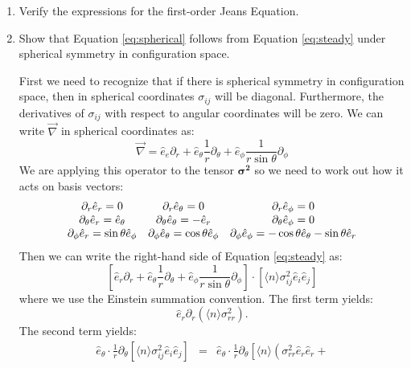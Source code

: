 \begin{enumerate}
\item Verify the expressions for the first-order Jeans Equation. 
\item Show that Equation \ref{eq:spherical} follows from
Equation \ref{eq:steady} under spherical symmetry in configuration
space. 
\begin{answer}
First we need to recognize that if there is spherical symmetry in
configuration space, then in spherical coordinates $\sigma_{ij}$ will
be diagonal. Furthermore, the derivatives of $\sigma_{ij}$ with
respect to angular coordinates will be zero. We can write
$\vec{\nabla}$ in spherical coordinates as:
\begin{equation}
\vec{\nabla} = {\hat e}_e \partial_r + {\hat
e}_\theta \frac{1}{r} \partial_\theta + {\hat
e}_\phi \frac{1}{r\sin\theta} \partial_\phi
\end{equation}
We are applying this operator to the tensor $\mathbf{\sigma^2}$ so we
need to work out how it acts on basis vectors:
\begin{equation}
\begin{array}{ccc}
\partial_r {\hat e}_r = 0 & 
\partial_r {\hat e}_\theta = 0 &
\partial_r {\hat e}_\phi = 0 \cr
\partial_\theta {\hat e}_r = {\hat e}_\theta & 
\partial_\theta {\hat e}_\theta = - {\hat e}_r &
\partial_\theta {\hat e}_\phi = 0 \cr
\partial_\phi {\hat e}_r = \sin\theta {\hat e}_\phi & 
\partial_\phi {\hat e}_\theta = \cos\theta {\hat e}_\phi &
\partial_\phi {\hat e}_\phi = - \cos\theta {\hat e}_\theta - \sin\theta {\hat e}_r \cr
\end{array}
\end{equation}
Then we can write the right-hand side of Equation \ref{eq:steady} as:
\begin{equation}
\left[{\hat e}_r \partial_r +
{\hat e}_\theta \frac{1}{r} \partial_\theta + 
{\hat e}_\phi \frac{1}{r\sin\theta} \partial_\phi\right] \cdot
\left[ \langle n\rangle \sigma_{ij}^2 {\hat e}_i {\hat e}_j \right]
\end{equation}
where we use the Einstein summation convention. The first term yields:
\begin{equation}
{\hat e}_r \partial_r \left(\langle n\rangle \sigma_{rr}^2\right).
\end{equation}
The second term yields:
\begin{eqnarray}
{\hat e}_\theta \cdot \frac{1}{r} \partial_\theta \left[ \langle
n\rangle \sigma_{ij}^2 {\hat e}_i {\hat e}_j \right] &=& 
{\hat e}_\theta \cdot \frac{1}{r} \partial_\theta
\left[\langle n \rangle \left(\sigma_{rr}^2 {\hat e}_r {\hat e}_r +

\end{eqnarray}
\end{answer}
\end{enumerate}
